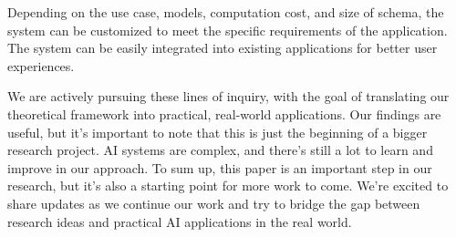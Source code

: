\documentclass[conference]{IEEEtran}
\begin{document}
Depending on the use case, models, computation cost, and size of schema, the
system can be customized to meet the specific requirements of the application.
The system can be easily integrated into existing applications for better user
experiences.

We are actively pursuing these lines of inquiry, with the goal of translating
our theoretical framework into practical, real-world applications. Our findings
are useful, but it's important to note that this is just the beginning of a
bigger research project. AI systems are complex, and there's still a lot to
learn and improve in our approach. To sum up, this paper is an important step
in our research, but it's also a starting point for more work to come. We're
excited to share updates as we continue our work and try to bridge the gap
between research ideas and practical AI applications in the real world.
\end{document}
